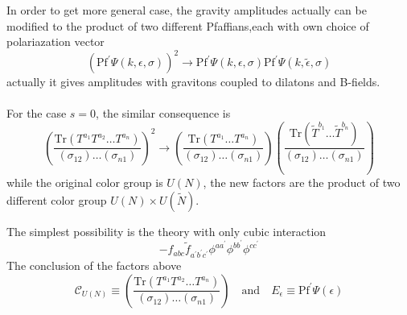 \documentclass{beamer}
\begin{document}
\begin{frame}
    In order to get more general case, the gravity amplitudes actually can be modified to the product of two different Pfaffians,each with own choice of polariazation vector
    \begin{equation*}
        \left(\mathrm{Pf}^\prime \Psi(k,\epsilon,\sigma)\right)^2\to\mathrm{Pf}^\prime \Psi(k,\epsilon,\sigma)\mathrm{Pf}^\prime \Psi(k,\tilde{\epsilon},\sigma)
    \end{equation*}
    actually it gives amplitudes with gravitons coupled to dilatons and B-fields.
    \\ \hspace*{\fill}\\
    For the case $s=0$, the similar consequence is 
    \begin{equation*}
        \left(\frac{\mathrm{Tr}(T^{a_1}T^{a_2}\dots T^{a_n})}{(\sigma_{12})\dots (\sigma_{n1})}\right)^2\to\left(\frac{\mathrm{Tr}(T^{a_1}\dots T^{a_n})}{(\sigma_{12})\dots (\sigma_{n1})}\right)
        \left(\frac{\mathrm{Tr}(\tilde{T}^{b_1}\dots \tilde{T}^{b_n})}{(\sigma_{12})\dots (\sigma_{n1})}\right)
    \end{equation*}
    while the original color group is $U(N)$, the new factors are the product of two different color group \alert{$U(N)\times U(\tilde{N})$}.
\end{frame}
\begin{frame}
    The simplest possibility is the theory with only cubic interaction
    \begin{equation*}
        -f_{abc}\tilde{f}_{a^\prime b^\prime c^\prime}\phi^{aa^\prime}\phi^{bb^\prime}\phi^{cc^\prime}
    \end{equation*}
    The conclusion of the factors above
    \begin{equation*}
        \mathcal{C}_{U(N)}\equiv \left(\frac{\mathrm{Tr}(T^{a_1}T^{a_2}\dots T^{a_n})}{(\sigma_{12})\dots (\sigma_{n1})}\right)\quad \mathrm{and} \quad E_\epsilon\equiv\mathrm{Pf}^{'}\Psi(\epsilon)
    \end{equation*}
    

\end{frame}
\end{document}
